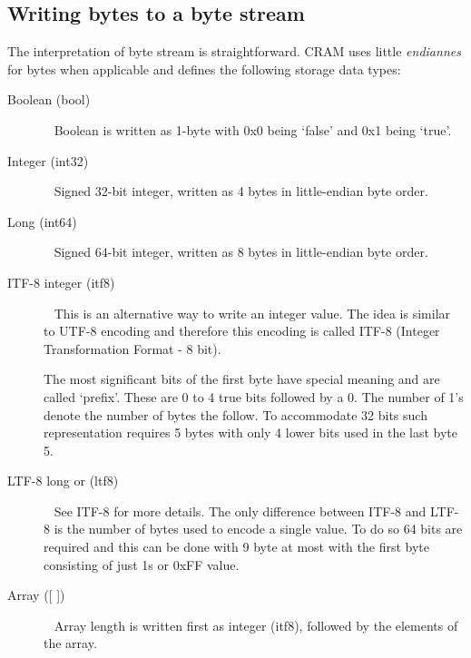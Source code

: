 \documentclass[a4paper]{article}
\begin{document}
\subsection{\textbf{Writing bytes to a byte stream}}

The interpretation of byte stream is straightforward. CRAM uses little \emph{endiannes} 
for bytes when applicable and defines the following storage data types:

\begin{description}

\item[Boolean (bool)]\ \newline
Boolean is written as 1-byte with 0x0 being `false' and 0x1 being `true'.

\item[Integer (int32)]\ \newline
Signed 32-bit integer, written as 4 bytes in little-endian byte order.

\item[Long (int64)]\ \newline
Signed 64-bit integer, written as 8 bytes in little-endian byte order.

\item[ITF-8 integer (itf8)]\ \newline
This is an alternative way to write an integer value. The idea is similar to UTF-8 
encoding and therefore this encoding is called ITF-8 (Integer Transformation Format 
- 8 bit). 

The most significant bits of the first byte have special meaning and are called 
`prefix'. These are 0 to 4 true bits followed by a 0. The number of 1's denote 
the number of bytes the follow. To accommodate 32 bits such representation requires 
5 bytes with only 4 lower bits used in the last byte 5.

\item[LTF-8 long or (ltf8)]\ \newline
See ITF-8 for more details. The only difference between ITF-8 and LTF-8 is the 
number of bytes used to encode a single value. To do so 64 bits are required and 
this can be done with 9 byte at most with the first byte consisting of just 1s 
or 0xFF value. 

\item[{Array ([ ])}]\ \newline
Array length is written first as integer (itf8), followed by the elements of the 
array. 
\end{description}
\end{document}
